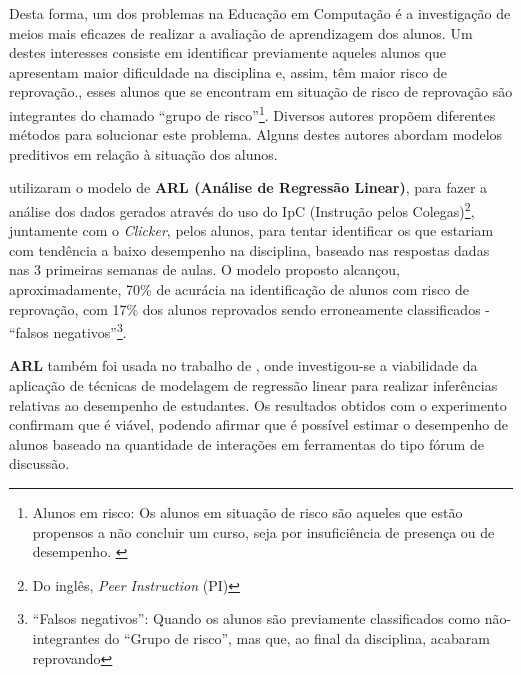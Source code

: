 \documentclass[
	12pt,				%
	openright,			%
	oneside,
	a4paper,			%
	english,			%
	french,				%
	spanish,			%
	brazil,				%
	]{abntex2}
\begin{document}
Desta forma, um dos problemas na Educação em Computação é a investigação de meios mais eficazes de realizar a avaliação de aprendizagem dos alunos. Um destes interesses consiste em identificar previamente aqueles alunos que apresentam maior dificuldade na disciplina e, assim, têm maior risco de reprovação.\cite{martins2012assistente}, esses alunos que se encontram em situação de risco de reprovação são integrantes do chamado ``grupo de risco''\footnote[1]{Alunos em risco: Os alunos em situação de risco são aqueles que estão propensos a não concluir um curso, seja por insuficiência de presença ou de desempenho. \cite{da2014alunos}}. Diversos autores propõem diferentes métodos para solucionar este problema. Alguns destes autores abordam modelos preditivos em relação à situação dos alunos.




 utilizaram o modelo de \textbf{ARL (Análise de Regressão Linear)}, para fazer a análise dos dados gerados através do uso do IpC (Instrução pelos Colegas)\footnote[2]{Do inglês, \textit{Peer Instruction} (PI)}, juntamente com o \textit{Clicker}, pelos alunos, para tentar identificar os que estariam com tendência a baixo desempenho na disciplina, baseado nas respostas dadas nas 3 primeiras semanas de aulas. O modelo proposto alcançou, aproximadamente, 70\% de acurácia na identificação de alunos com risco de reprovação, com 17\% dos alunos reprovados sendo erroneamente classificados - ``falsos negativos''\footnote[3]{``Falsos negativos'': Quando os alunos são previamente classificados como não-integrantes do ``Grupo de risco'', mas que, ao final da disciplina, acabaram reprovando}.

\textbf{ARL} também foi usada no trabalho de , onde investigou-se a viabilidade da aplicação de técnicas de modelagem de regressão linear para realizar inferências relativas ao desempenho de estudantes. Os resultados obtidos com o experimento confirmam que é viável, podendo afirmar que é possível estimar o desempenho de alunos baseado na quantidade de interações em ferramentas do tipo fórum de discussão. 
\end{document}
